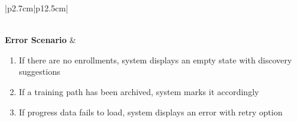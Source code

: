 \begin{table}[H]
\begin{tabular}{|p{2.7cm}|p{12.5cm}|}
\begin{minipage}[t]{\linewidth}
\begin{enumerate}[topsep=0pt,itemsep=1pt,parsep=0pt,partopsep=0pt]
                                          \end{enumerate}
                                      \end{minipage}                                          \\
            \hline
            \textbf{Error Scenario} & \begin{minipage}[t]{\linewidth}
                                          \begin{enumerate}[topsep=0pt,itemsep=1pt,parsep=0pt,partopsep=0pt]
                                              \item If there are no enrollments, system displays an empty state with discovery
                                                    suggestions
                                              \item If a training path has been archived, system marks it accordingly
                                              \item If progress data fails to load, system displays an error with retry option
                                          \end{enumerate}
                                      \end{minipage}                                              \\
            \hline
        \end{tabular}
        \label{tab:eng-view-enrolled-paths}
    \end{table}
